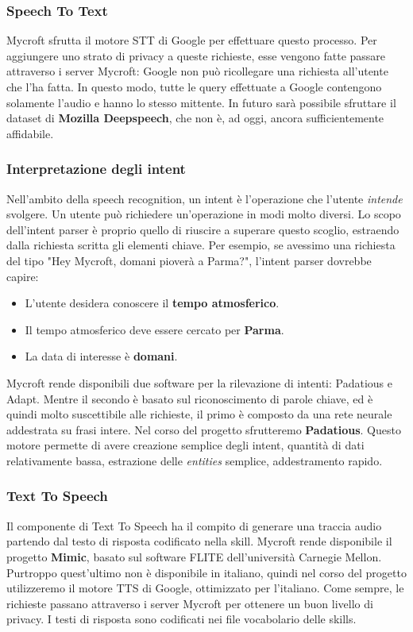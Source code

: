 \subsubsection{Speech To Text}
Mycroft sfrutta il motore STT di Google per effettuare questo processo. Per aggiungere uno strato di privacy a queste richieste, esse vengono fatte passare attraverso i server Mycroft: Google non può ricollegare una richiesta all'utente che l'ha fatta. In questo modo, tutte le query effettuate a Google contengono solamente l'audio e hanno lo stesso mittente. In futuro sarà possibile sfruttare il dataset di \textbf{Mozilla Deepspeech}, che non è, ad oggi, ancora sufficientemente affidabile.
\subsubsection{Interpretazione degli intent}
Nell'ambito della speech recognition, un intent è l'operazione che l'utente \textit{intende} svolgere. Un utente può richiedere un'operazione in modi molto diversi. Lo scopo dell'intent parser è proprio quello di riuscire a superare questo scoglio, estraendo dalla richiesta scritta gli elementi chiave. Per esempio, se avessimo una richiesta del tipo "Hey Mycroft, domani pioverà a Parma?", l'intent parser dovrebbe capire:
\begin{itemize}
    \item L'utente desidera conoscere il \textbf{tempo atmosferico}.
    \item Il tempo atmosferico deve essere cercato per \textbf{Parma}.
    \item La data di interesse è \textbf{domani}.
\end{itemize}
Mycroft rende disponibili due software per la rilevazione di intenti: Padatious e Adapt. Mentre il secondo è basato sul riconoscimento di parole chiave, ed è quindi molto suscettibile alle richieste, il primo è composto da una rete neurale addestrata su frasi intere. Nel corso del progetto sfrutteremo \textbf{Padatious}.
Questo motore permette di avere creazione semplice degli intent, quantità di dati relativamente bassa, estrazione delle \textit{entities} semplice, addestramento rapido.
\subsubsection{Text To Speech}
Il componente di Text To Speech ha il compito di generare una traccia audio partendo dal testo di risposta codificato nella skill. Mycroft rende disponibile il progetto \textbf{Mimic}, basato sul software FLITE dell'università Carnegie Mellon. Purtroppo quest'ultimo non è disponibile in italiano, quindi nel corso del progetto utilizzeremo il motore TTS di Google, ottimizzato per l'italiano. Come sempre, le richieste passano attraverso i server Mycroft per ottenere un buon livello di privacy.
I testi di risposta sono codificati nei file vocabolario delle skills.
